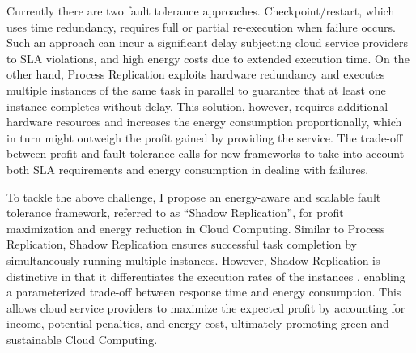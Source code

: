 Currently there are two fault tolerance approaches. %
Checkpoint/restart, which
uses time redundancy, requires full or partial re-execution when failure occurs. 
Such an approach
can incur a significant delay subjecting cloud service providers to SLA violations,
and high energy costs due to extended execution time.
On the other hand, Process Replication exploits hardware redundancy and executes multiple
instances of the same task in parallel to guarantee that at least one instance completes without delay.  %
This solution,
however, requires additional hardware resources and increases the energy consumption proportionally, which
in turn might outweigh the profit gained by providing the service.
The trade-off between profit and fault tolerance calls for new
frameworks to take into account both SLA requirements and energy consumption in
dealing with failures.

To tackle the above challenge, I propose an energy-aware and scalable fault tolerance framework, referred to as “Shadow Replication”, for profit maximization and energy reduction in Cloud Computing. Similar to Process Replication, Shadow Replication ensures successful task completion by simultaneously running multiple instances. However, Shadow Replication is distinctive in that it differentiates the execution rates of the instances%
, enabling a parameterized trade-off between response time and energy consumption. This allows cloud service providers to maximize the expected profit by accounting for income, potential penalties, and energy cost, ultimately promoting green and sustainable Cloud Computing.

